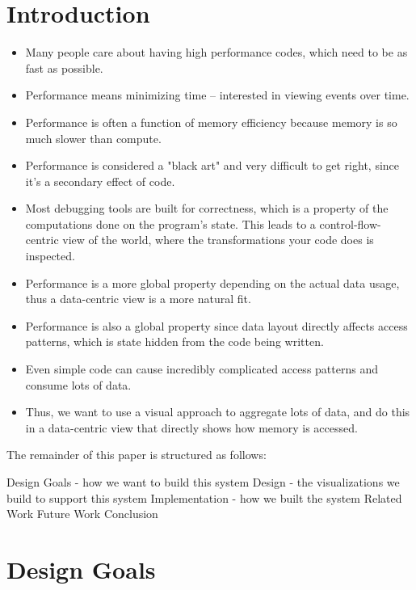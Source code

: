 \documentclass[annual]{acmsiggraph}
\begin{document}
\section{Introduction}

  
  \begin{itemize}
  \item Many people care about having high performance codes, which need to be as fast as possible. 
  \item Performance means minimizing time -- interested in viewing events over time.
  \item Performance is often a function of memory efficiency because memory is so much slower than compute.
  \item Performance is considered a "black art" and very difficult to get right, since it's a secondary effect of code.

  \item Most debugging tools are built for correctness, which is a property of the computations done on the program's state. This leads to a control-flow-centric view of the world, where the transformations your code does is inspected.
  \item Performance is a more global property depending on the actual data usage, thus a data-centric view is a more natural fit.
  \item Performance is also a global property since data layout directly affects access patterns, which is state hidden from the code being written.
  \item Even simple code can cause incredibly complicated access patterns and consume lots of data.
  \item Thus, we want to use a visual approach to aggregate lots of data, and do this in a data-centric view that directly shows how memory is accessed.
  \end{itemize}
  
    The remainder of this paper is structured as follows:

    Design Goals - how we want to build this system
    Design - the visualizations we build to support this system
    Implementation - how we built the system
    Related Work
    Future Work 
    Conclusion
  
\section{Design Goals}
\end{document}
